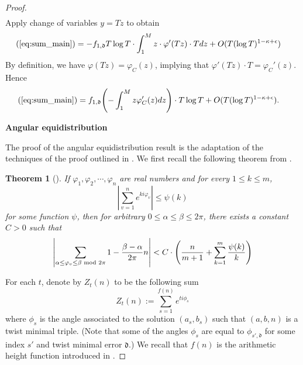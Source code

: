 \documentclass[12pt]{amsart}
\newcounter{counter}[section] %
\numberwithin{equation}{section} %
\newtheorem{theorem}[counter]{Theorem}
\theoremstyle{definition} \newtheorem{definition}[counter]{Definition}
\theoremstyle{remark} \newtheorem{nonexam}[counter]{Non-example}
\let\originalleft\left \let\originalright\right
\renewcommand{\left}{\mathopen{}\mathclose\bgroup\originalleft}
\renewcommand{\right}{\aftergroup\egroup\originalright}
\begin{document}
\begin{proof}
\begin{align}
    \end{align}
    Apply change of variables $y = Tz$ to obtain
    \begin{align}
        \begin{split}
            (\ref{eq:sum_main}) &= - f_{1,\mathfrak{d}} T \log T \cdot \int_{1}^{M} z \cdot \varphi'(Tz) \cdot T dz + O(T (\log T)^{1-\kappa + \epsilon})
        \end{split}
    \end{align}
    By definition, we have $\varphi(Tz) = \varphi_{C}(z)$, implying that $\varphi'(Tz) \cdot T = \varphi_{C}'(z)$. Hence
    \begin{align}
        \begin{split}
            (\ref{eq:sum_main}) &= f_{1,\mathfrak{d}} \left( - \int_{1}^{M} z \varphi'_{C}(z) dz \right) \cdot T \log T + O(T (\log T)^{1-\kappa + \epsilon}).
        \end{split}
    \end{align}

\medskip
\textbf{Angular equidistribution}
\medskip
    
    The proof of the angular equidistribution result is the adaptation of the techniques of the proof outlined in \cite{EH99}. We first recall the following theorem from \cite{ET48}.
    \begin{theorem}[\cite{ET48}] \label{theorem:ET}
        If $\varphi_1, \varphi_2, \cdots, \varphi_n$ are real numbers and for every $1 \leq k \leq m$, 
        \begin{equation}
            |\sum_{v=1}^n e^{k i \varphi_v} | \leq \psi(k)
        \end{equation}
        for some function $\psi$, then for arbitrary $0 \leq \alpha \leq \beta \leq 2 \pi$, there exists a constant $C > 0$ such that
        \begin{equation}
            \left| \sum_{\alpha \leq \varphi_v \leq \beta \text{ mod } 2 \pi} 1 -  \frac{\beta - \alpha}{2 \pi} n \right| < C \cdot \left( \frac{n}{m+1} + \sum_{k=1}^m \frac{\psi(k)}{k} \right)
        \end{equation}
    \end{theorem}
    For each $t$, denote by $Z_t(n)$ to be the following sum
    \begin{equation}
        Z_t(n) := \sum_{s=1}^{f(n)} e^{ti\phi_s}
    \end{equation}
    where $\phi_s$ is the angle associated to the solution $(a_s, b_s)$ such that $(a,b,n)$ is a twist minimal triple. (Note that some of the angles $\phi_{s}$ are equal to $\phi_{s',\mathfrak{d}}$ for some index $s'$ and twist minimal error $\mathfrak{d}$.) We recall that $f(n)$ is the arithmetic height function introduced in .


\end{proof}
\end{document}
